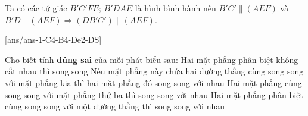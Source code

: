 \begin{ex}
{\begin{center}
			\end{center}
			Ta có các tứ giác $B'C'FE$; $B'DAE$ là hình bình hành nên $B'C'\parallel (AEF)$ và\\ $B'D\parallel (AEF)$$\Rightarrow (DB'C')\parallel (AEF)$.}
	\end{ex}

\cauds
{}[ans/ans-1-C4-B4-De2-DS]
\begin{ex}%
	Cho biết tính \textbf{đúng sai} của mỗi phát biểu sau:
	\choiceTF
	{\True Hai mặt phẳng phân biệt không cắt nhau thì song song}
	{Nếu mặt phẳng này chứa hai đường thẳng cùng song song với mặt phẳng kia thì hai mặt phẳng đó song song với nhau}
	{Hai mặt phẳng cùng song song với mặt phẳng thứ ba thì song song với nhau}
	{Hai mặt phẳng phân biệt cùng song song với một đường thẳng thì song song với nhau}
\end{ex}
